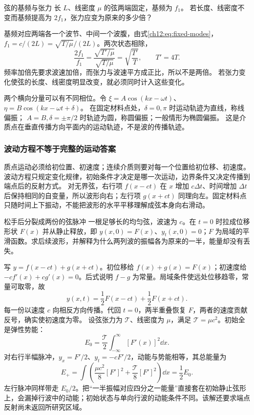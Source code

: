 \begin{origexamplebox}{弦的基频与张力}
\label{ch12:ex:02}
长 $L$、线密度 $\mu$ 的弦两端固定，基频为 $f_1$。
若长度、线密度不变而基频提高为 $2f_1$，张力应变为原来的多少倍？

\ThQStringFrequency
\end{origexamplebox}
\begin{xesolution}
\ThAStringFrequency

基频对应两端各一个波节、中间一个波腹，由式\eqref{ch12:eq:fixed-modes}，
$f_1=c/(2L)=\sqrt{T/\mu}/(2L)$。两次状态相除，
\[
 \frac{2f_1}{f_1}=\frac{\sqrt{T'/\mu}}{\sqrt{T/\mu}}
 =\sqrt{\frac{T'}T},\qquad \boxed{T'=4T}.
\]
频率加倍先要求波速加倍，而张力与波速平方成正比，所以不是两倍。
若张力变化使弦的长度、线密度明显改变，就必须同时计入这些变化。
\end{xesolution}

两个横向分量可以有不同相位。令
$\xi=A\cos(kx-\omega t)$、
$\eta=B\cos(kx-\omega t+\delta)$。
在固定材料点处，$\delta=0,\pi$ 时运动轨迹为直线，称线偏振；
$A=B,\delta=\pm\pi/2$ 时轨迹为圆，称圆偏振；一般情形为椭圆偏振。
这是介质点在垂直传播方向平面内的运动轨迹，不是波的传播轨迹。
\subsubsection{波动方程不等于完整的运动答案}
质点运动必须给初位置、初速度；连续介质则要对每一个位置给初位移、初速度。波动方程只规定变化规律，初始条件才决定是哪一次运动，边界条件又决定传播到端点后的反射方式。
对无界弦，右行项 $f(x-ct)$ 在 $x$ 增加 $c\Delta t$、时间增加 $\Delta t$ 后保持相同的自变量，所以波形向右；左行项 $g(x+ct)$ 同理向左。固定材料点只随时间上下振动，不能把波形的水平平移理解成弦本身向右滑动。

\begin{origexamplebox}{松手后分裂成两份的弦脉冲}\label{ch12:ex:teaching-initial-pulse}
一根足够长的均匀弦，波速为 $c$。在 $t=0$ 时拉成位移形状 $F(x)$ 并从静止释放，即 $y(x,0)=F(x)$、$y_t(x,0)=0$；$F$ 为局域的平滑函数。求后续波形，并解释为什么两列波的振幅各为原来的一半，能量却没有丢失。

\ThQPulse
\end{origexamplebox}
\begin{xesolution}
\ThAPulse

写 $y=f(x-ct)+g(x+ct)$。初位移给 $f(x)+g(x)=F(x)$；初速度给 $-cf'(x)+cg'(x)=0$。后式说明 $f-g$ 为常量。局域条件使远处位移趋零，常量可取零，故
\[
 y(x,t)=\frac12F(x-ct)+\frac12F(x+ct).
\]
每一份以速度 $c$ 向相反方向传播。代回 $t=0$，两半重叠恢复 $F$，两者的速度贡献反号，确实使初速度为零。
设弦张力为 $\mathcal T$、线密度为 $\mu$，满足 $\mathcal T=\mu c^2$。初始全是弹性势能：
\[
 E_0=\frac{\mathcal T}{2}\int_{-\infty}^{\infty}[F'(x)]^2\dd x.
\]
对右行半幅脉冲，$y_x=F'/2$、$y_t=-cF'/2$，动能与势能相等，其总能量为
\[
 E_+=\int\left(\frac{\mu c^2}{8}[F']^2+
 \frac{\mathcal T}{8}[F']^2\right)\dd x=\frac12E_0.
\]
左行脉冲同样带走 $E_0/2$。把“一半振幅对应四分之一能量”直接套在初始静止弦形上，会漏掉行波中的动能；初始状态与单向行波的动能条件不同。该解还要求端点反射尚未返回所研究区域。
\end{xesolution}

